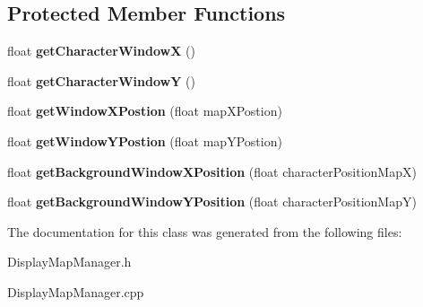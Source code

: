 \subsection*{Protected Member Functions}
\begin{DoxyCompactItemize}
\item 
\mbox{\label{class_display_map_manager_a9f3a6841688b7e4932ca1269588d4504}} 
float {\bfseries get\+Character\+WindowX} ()
\item 
\mbox{\label{class_display_map_manager_a4a17bf69eb158d10c6af0b5467735d60}} 
float {\bfseries get\+Character\+WindowY} ()
\item 
\mbox{\label{class_display_map_manager_af26ef96ab1e1e2c33e9160a8a66263f7}} 
float {\bfseries get\+Window\+X\+Postion} (float map\+X\+Postion)
\item 
\mbox{\label{class_display_map_manager_ad850ee0bd93bab3cf376ce343eabfff0}} 
float {\bfseries get\+Window\+Y\+Postion} (float map\+Y\+Postion)
\item 
\mbox{\label{class_display_map_manager_a12847fea83dc76f47255605f7de3d020}} 
float {\bfseries get\+Background\+Window\+X\+Position} (float character\+Position\+MapX)
\item 
\mbox{\label{class_display_map_manager_a7326948a0f1ef16c89a27f5bde09192b}} 
float {\bfseries get\+Background\+Window\+Y\+Position} (float character\+Position\+MapY)
\end{DoxyCompactItemize}


The documentation for this class was generated from the following files\+:\begin{DoxyCompactItemize}
\item 
Display\+Map\+Manager.\+h\item 
Display\+Map\+Manager.\+cpp\end{DoxyCompactItemize}
